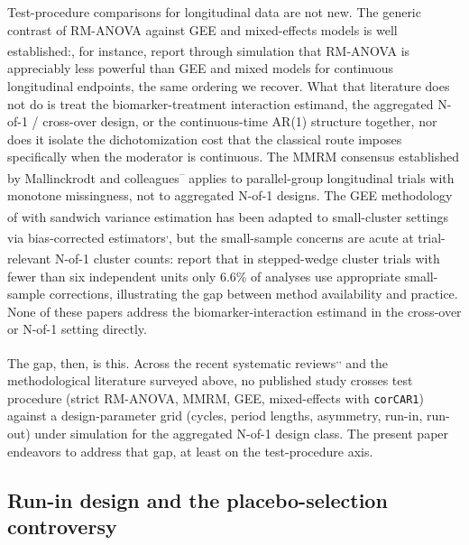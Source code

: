 \documentclass[
  11pt,
]{article}
\begin{document}
Test-procedure comparisons for longitudinal data are not new. The
generic contrast of RM-ANOVA against GEE and mixed-effects models
is well established:\textsuperscript{}, for instance, report through
simulation that RM-ANOVA is appreciably less powerful than GEE
and mixed models for continuous longitudinal endpoints, the same
ordering we recover. What that literature does not do is treat
the biomarker-treatment interaction estimand, the aggregated
N-of-1 / cross-over design, or the continuous-time AR(1)
structure together, nor does it isolate the dichotomization cost
that the classical route imposes specifically when the moderator
is continuous. The MMRM consensus established by Mallinckrodt and
colleagues\textsuperscript{--} applies to
parallel-group longitudinal trials with monotone missingness, not
to aggregated N-of-1 designs. The GEE methodology of\textsuperscript{}
with sandwich variance estimation has been adapted to
small-cluster settings via bias-corrected estimators\textsuperscript{,}, but the small-sample concerns are
acute at trial-relevant N-of-1 cluster counts:\textsuperscript{}
report that in stepped-wedge cluster trials with fewer than six
independent units only 6.6\% of analyses use appropriate
small-sample corrections, illustrating the gap between method
availability and practice. None of these papers address the
biomarker-interaction estimand in the cross-over or N-of-1
setting directly.

The gap, then, is this. Across the recent systematic reviews\textsuperscript{,,} and the
methodological literature surveyed above, no published study
crosses test procedure (strict RM-ANOVA, MMRM, GEE,
mixed-effects with \texttt{corCAR1}) against a design-parameter grid
(cycles, period lengths, asymmetry, run-in, run-out) under
simulation for the aggregated N-of-1 design class. The present
paper endeavors to address that gap, at least on the
test-procedure axis.

\subsection{Run-in design and the placebo-selection controversy}\label{run-in-design-and-the-placebo-selection-controversy}
\end{document}
